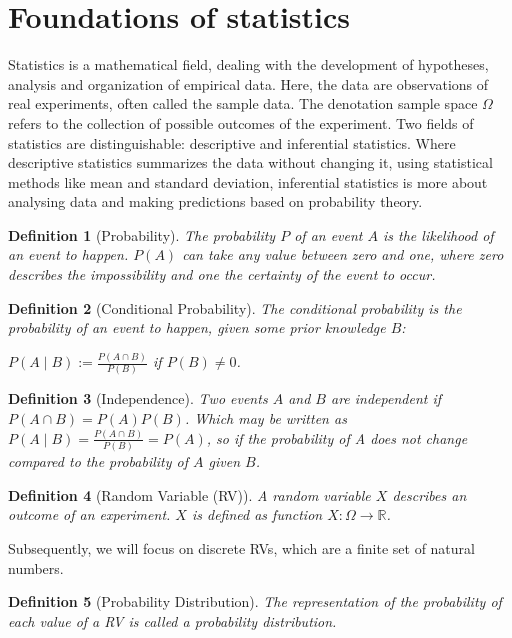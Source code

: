 \section{Foundations of statistics} 
\label{section:statistics}
Statistics is a mathematical field, dealing with the development of hypotheses, analysis and organization of empirical data. Here, the data are observations of real experiments, often called the sample data. The denotation sample space $\Omega$ refers to the collection of possible outcomes of the experiment\cite{Philosophy}. Two fields of statistics are distinguishable: descriptive and inferential statistics. Where descriptive statistics summarizes the data without changing it, using statistical methods like mean and standard deviation, inferential statistics is more about analysing data and making predictions based on probability theory\cite{Introduction}.\\
\newtheorem{definition}{Definition}
\begin{definition}[Probability]
The probability $P$ of an event $A$ is the likelihood of an event to happen. $P(A)$ can take any value between zero and one, where zero describes the impossibility and one the certainty of the event to occur\cite{BayStat}.
\end{definition}
\begin{definition}[Conditional Probability]
The conditional probability is the probability of an event to happen, given some prior knowledge $B$:\\
\begin{center}
$P(A \mid B) := \frac{P(A \cap B)}{P(B)}$ if $P(B) \neq 0$\cite{BayStat}.
\end{center}
\end{definition}
\begin{definition}[Independence]
Two events $A$ and $B$ are independent if $P(A \cap B) = P(A)P(B)$. Which may be written as $P(A\mid B) = \frac{P(A \cap B)}{P(B)} = P(A)$, so if the probability of A does not change compared to the probability of $A$ given $B$\cite{Probability}.
\end{definition}
\begin{definition}[Random Variable (RV)]
A random variable $X$ describes an outcome of an experiment. $X$ is defined as function $X : \Omega \rightarrow \mathbb{R}$\cite{ProbTheo}.
\end{definition}
Subsequently, we will focus on discrete \acp{RV}, which are a finite set of natural numbers.
\begin{definition}[Probability Distribution]
The representation of the probability of each value of a \ac{RV} is called a probability distribution\cite{ProbDistri}.
\end{definition}
